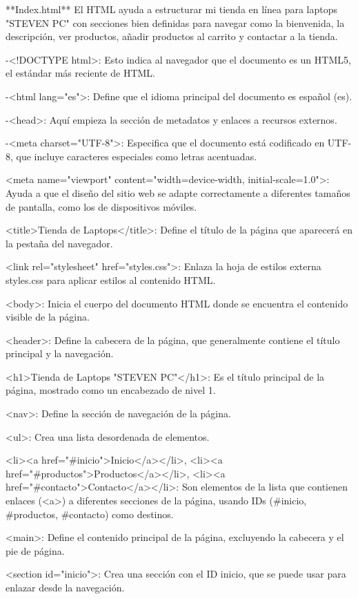 **Index.html**
El HTML ayuda a estructurar mi tienda en línea para laptops "STEVEN PC" con
secciones bien definidas para navegar como la bienvenida, la descripción,
ver productos, añadir productos al carrito y contactar a la tienda.

-<!DOCTYPE html>: Esto indica al navegador que el documento es un HTML5,
el estándar más reciente de HTML.

-<html lang="es">: Define que el idioma principal del documento es español (es).

-<head>: Aquí empieza la sección de metadatos y enlaces a recursos externos.

-<meta charset="UTF-8">: Especifica que el documento está codificado en UTF-8, 
que incluye caracteres especiales como letras acentuadas.

<meta name="viewport" content="width=device-width, initial-scale=1.0">: Ayuda a 
que el diseño del sitio web se adapte correctamente a diferentes tamaños de
pantalla, como los de dispositivos móviles.

<title>Tienda de Laptops</title>: Define el título de la página 
que aparecerá en la pestaña del navegador.

<link rel="stylesheet" href="styles.css">: Enlaza la hoja de estilos
externa styles.css para aplicar estilos al contenido HTML.

<body>: Inicia el cuerpo del documento HTML donde se encuentra 
el contenido visible de la página.

<header>: Define la cabecera de la página, que generalmente contiene
el título principal y la navegación.

<h1>Tienda de Laptops "STEVEN PC"</h1>: Es el título principal de la página,
mostrado como un encabezado de nivel 1.

<nav>: Define la sección de navegación de la página.

<ul>: Crea una lista desordenada de elementos.

<li><a href="#inicio">Inicio</a></li>, <li><a href="#productos">Productos</a></li>, 
<li><a href="#contacto">Contacto</a></li>: Son elementos de la lista que contienen 
enlaces (<a>) a diferentes secciones de la página, usando IDs 
(#inicio, #productos, #contacto) como destinos.

<main>: Define el contenido principal de la página, excluyendo la cabecera
y el pie de página.

<section id="inicio">: Crea una sección con el ID inicio, que se puede usar 
para enlazar desde la navegación.

